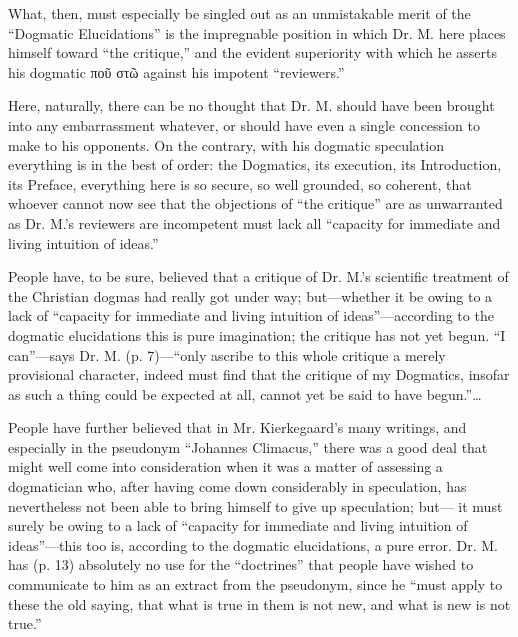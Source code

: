 \documentclass[12pt,a4paper,openany]{book}
\newcommand{\opage}[1]{\marginnote{\footnotesize\textit{[#1]}}}
\begin{document}
What, then, must especially be singled out as an unmistakable
\setcounter{footnote}{0}%
\opage{4}merit of the ``Dogmatic Elucidations'' is the impregnable
position in which Dr. M. here places himself toward ``the critique,'' and the
evident superiority with which he asserts his dogmatic
ποῦ στῶ against his impotent ``reviewers.''

Here, naturally, there can be no thought that Dr.
M. should have been brought into any embarrassment whatever, or should have
even a single concession to make to his opponents.
On the contrary, with his dogmatic speculation everything is in the
best of order: the Dogmatics, its execution, its Introduction,
its Preface, everything here is so secure, so well grounded, so coherent,
that whoever cannot now see that the objections of ``the critique''
are as unwarranted as Dr. M.'s reviewers are
incompetent must lack all ``capacity for immediate and living
intuition of ideas.''

People have, to be sure, believed that a critique of Dr.
M.'s scientific treatment of the Christian dogmas had really
got under way; but---whether it be owing to a lack
of ``capacity for immediate and living intuition of ideas''---according
to the dogmatic elucidations this is pure imagination;
the critique has not yet begun. ``I can''---says
Dr. M. (p. 7)---``only ascribe to this whole critique a merely
provisional character, indeed must find that the critique of my
Dogmatics, insofar as such a thing could be expected at all,
cannot yet be said to have begun.''\dots{}

People have further believed that in Mr. Kierkegaard's
many writings, and especially in the pseudonym ``Johannes Climacus,''
there was a good deal that might well come into consideration
when it was a matter of assessing a dogmatician who,
after having come down considerably in speculation, has nevertheless not
been able to bring himself to give up speculation; but---
\setcounter{footnote}{0}%
\opage{5}it must surely be owing to a lack of ``capacity for immediate and
living intuition of ideas''---this too is, according to the dogmatic
elucidations, a pure error. Dr. M. has (p.
13) absolutely no use for the ``doctrines'' that people have wished to communicate to him as an
extract from the pseudonym, since he
``must apply to these the old saying, that what is true in them
is not new, and what is new is not true.''
\end{document}
